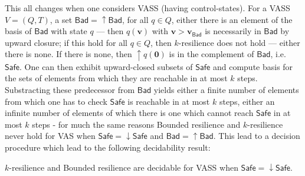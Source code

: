 \documentclass[runningheads]{llncs}
\newcommand{\Bad}{\textsf{Bad}}
\newcommand{\Safe}{\textsf{Safe}}
\begin{document}
This all changes when one considers VASS (having control-states). For a VASS $V = (Q,T)$, a set $\Bad = \uparrow \Bad$, for all $q \in Q$, either there is an element of the basis of $\Bad$ with state $q$ \----
then $q(\textbf{v})$ with $\textbf{v} > \textbf{v}_{\Bad}$ is necessarily in $\Bad$ by upward closure; if this hold for all $q \in Q$, then $k$-resilience does not hold \---- either there is none. If there is none, then 
$\uparrow q(\textbf{0})$
 is in the complement of $\Bad$, i.e. $\Safe$. One can then exhibit upward-closed subsets of 
 $\Safe$ and compute basis for the sets of elements from which they are reachable in at most $k$ steps. 
Substracting these predecessor from $\Bad$ yields either a finite number of elements from which one has to check $\Safe$ is reachable in at most $k$ steps, either an infinite number of elements of which there is one which cannot reach $\Safe$ in at most $k$ steps \-- for much the same reasons {\sc Bounded resilience} and {\sc $k$-resilience} never hold for VAS when $\Safe = \downarrow \Safe$ and $\Bad = \uparrow \Bad$. This lead to a decision procedure
 which lead to the following decidability result:
\begin{theorem}
{\sc $k$-resilience }  and {\sc Bounded resilience} are decidable for VASS when 
$\Safe = \downarrow \Safe$.
\end{theorem}
\end{document}
